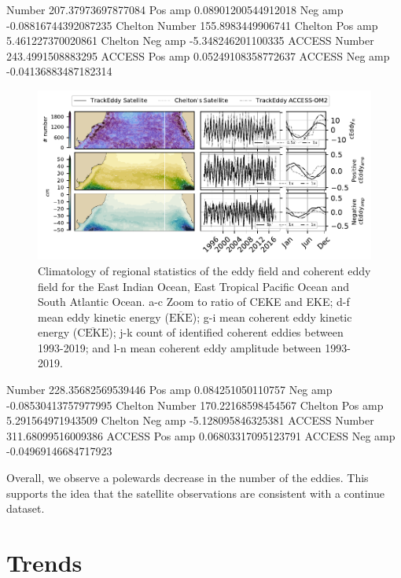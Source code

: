 \documentclass[draft,linenumbers]{agujournal2019}
\newcommand{\MEKE}{\overline{\textrm{EKE}}}
\newcommand{\MCEKE}{\overline{\textrm{CEKE}}}
\begin{document}
	Number 207.37973697877084
	Pos amp 0.08901200544912018
	Neg amp -0.08816744392087235
	Chelton Number 155.8983449906741
	Chelton Pos amp 5.461227370020861
	Chelton Neg amp -5.348246201100335
	ACCESS Number 243.4991508883295
	ACCESS Pos amp 0.05249108358772637
	ACCESS Neg amp -0.04136883487182314

	\begin{figure}
	    \centering
	    \includegraphics[width=1\textwidth]{figures/regional_eke_ceke_stats_2.pdf}
	    \caption{Climatology of regional statistics of the eddy field and coherent eddy field for the East Indian Ocean, East Tropical Pacific Ocean and South Atlantic Ocean. a-c Zoom to ratio of CEKE and EKE; d-f  mean eddy kinetic energy ($\MEKE$); g-i mean coherent eddy kinetic energy ($\MCEKE$); j-k count of identified coherent eddies between 1993-2019; and l-n mean coherent eddy amplitude between 1993-2019.}
	    \label{fig:south_atlantic_cycle}
	\end{figure}

	Number 228.35682569539446
	Pos amp 0.084251050110757
	Neg amp -0.08530413757977995
	Chelton Number 170.22168598454567
	Chelton Pos amp 5.291564971943509
	Chelton Neg amp -5.128095846325381
	ACCESS Number 311.68099516009386
	ACCESS Pos amp 0.06803317095123791
	ACCESS Neg amp -0.04969146684717923


	Overall, we observe a polewards decrease in the number of the eddies. This supports the idea that the satellite observations are consistent with a continue dataset.




	\section{Trends}
\end{document}
